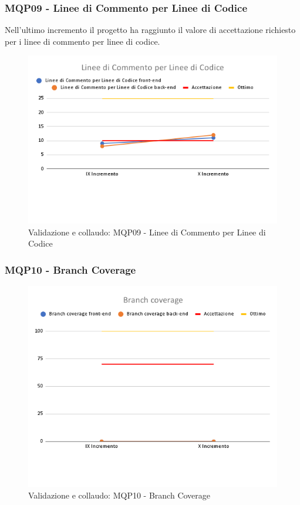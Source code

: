 \subsubsection{MQP09 - Linee di Commento per Linee di Codice}
Nell'ultimo incremento il progetto ha raggiunto il valore di accettazione richiesto per i linee di commento per linee di codice.
\begin{figure}[H]
    \centering
    \includegraphics[scale=0.50]{Sezioni/images/last_prodotto/Linee_di_Commento_per Linee_di_Codice.png}
    \caption{Validazione e collaudo: MQP09 - Linee di Commento per Linee di Codice}
\end{figure}
\subsubsection{MQP10 - Branch Coverage}
\begin{figure}[H]
    \centering
    \includegraphics[scale=0.50]{Sezioni/images/last_prodotto/Branch_coverage.png}
    \caption{Validazione e collaudo: MQP10 - Branch Coverage}
\end{figure}
